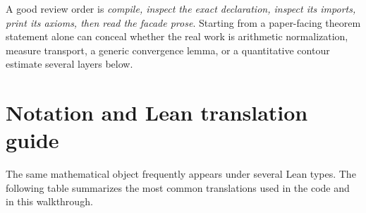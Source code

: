 \documentclass[11pt,a4paper,openany]{book}
\begin{document}
\begin{engineering}
A good review order is \emph{compile, inspect the exact declaration, inspect
its imports, print its axioms, then read the facade prose}.  Starting from a
paper-facing theorem statement alone can conceal whether the real work is
arithmetic normalization, measure transport, a generic convergence lemma, or
a quantitative contour estimate several layers below.
\end{engineering}

\chapter{Notation and Lean translation guide}
\label{app:notation}
The same mathematical object frequently appears under several Lean types.  The
following table summarizes the most common translations used in the code and
in this walkthrough.
\end{document}
